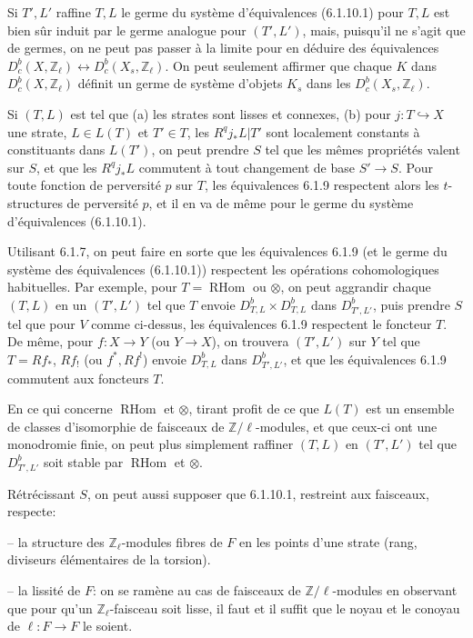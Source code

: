 \documentclass[12pt,a4paper]{article}
\theoremstyle{plain}
\theoremstyle{definition}
\theoremstyle{remark}
\DeclareMathOperator{\RHom}{RHom}
\newcommand{\ZZ}{\mathbb{Z}}
\begin{document}
Si $T', L'$ raffine $T, L$ le germe du syst\`eme d'\'equivalences (6.1.10.1) pour $T, L$ est bien s\^ur induit par le germe analogue pour $(T', L')$, mais, puisqu'il ne s'agit que de germes, on ne peut pas passer \`a la limite pour en d\'eduire des \'equivalences $D^b_c(X, \ZZ_{\ell}) \longleftrightarrow D^b_c(X_s, \ZZ_{\ell})$. On peut seulement affirmer que chaque $K$ dans $D^b_c(X, \ZZ_{\ell})$ d\'efinit un germe de syst\`eme d'objets $K_s$ dans les $D^b_c(X_s, \ZZ_{\ell})$.

Si $(T, L)$ est tel que (a) les strates sont lisses et connexes, (b) pour $j: T \hookrightarrow X$ une strate, $L \in L(T)$ et $T' \in T$, les $R^qj_*L|T'$ sont localement constants \`a constituants dans $L(T')$, on peut prendre $S$ tel que les m\^emes propri\'et\'es valent sur $S$, et que les $R^qj_*L$ commutent \`a tout changement de base $S' \to S$. Pour toute fonction de perversit\'e $p$ sur $T$, les \'equivalences 6.1.9 respectent alors les $t$-structures de perversit\'e $p$, et il en va de m\^eme pour le germe du syst\`eme d'\'equivalences (6.1.10.1).

Utilisant 6.1.7, on peut faire en sorte que les \'equivalences 6.1.9 (et le germe du syst\`eme des \'equivalences (6.1.10.1)) respectent les op\'erations cohomologiques habituelles. Par exemple, pour $T = \RHom$ ou $\otimes$, on peut aggrandir chaque $(T, L)$ en un $(T', L')$ tel que $T$ envoie $D^b_{T, L} \times D^b_{T, L}$ dans $D^b_{T', L'}$, puis prendre $S$ tel que pour $V$ comme ci-dessus, les \'equivalences 6.1.9 respectent le foncteur $T$. De m\^eme, pour $f: X \to Y$ (ou $Y \to X$), on trouvera $(T', L')$ sur $Y$ tel que $T = Rf_*$, $Rf_!$ (ou $f^*, Rf^!$) envoie $D^b_{T, L}$ dans $D^b_{T', L'}$, et que les \'equivalences 6.1.9 commutent aux foncteurs $T$.

En ce qui concerne $\RHom$ et $\otimes$, tirant profit de ce que $L(T)$ est un ensemble de classes d'isomorphie de faisceaux de $\ZZ/\ell$-modules, et que ceux-ci ont une monodromie finie, on peut plus simplement raffiner $(T, L)$ en $(T', L')$ tel que $D^b_{T', L'}$ soit stable par $\RHom$ et $\otimes$.

R\'etr\'ecissant $S$, on peut aussi supposer que 6.1.10.1, restreint aux faisceaux, respecte:

-- la structure des $\ZZ_{\ell}$-modules fibres de $F$ en les points d'une strate (rang, diviseurs \'el\'ementaires de la torsion).

-- la lissit\'e de $F$: on se ram\`ene au cas de faisceaux de $\ZZ/\ell$-modules en observant que pour qu'un $\ZZ_{\ell}$-faisceau soit lisse, il faut et il suffit que le noyau et le conoyau de $\ell: F \to F$ le soient.
\end{document}
